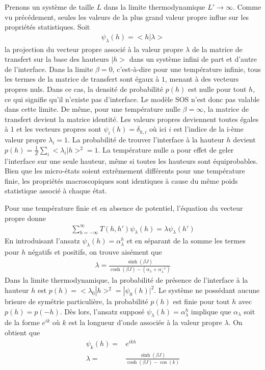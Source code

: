 Prenons un système de taille $L$ dans la limite thermodynamique $L'\to \infty$. Comme vu précédement, seules les valeurs de la plus grand valeur propre influe sur les propriétés statistiques. Soit 
\begin{align}
    \psi_\lambda(h)= <h|\lambda>
\end{align}
la projection du vecteur propre associé à la valeur propre $\lambda$ de la matrice de transfert sur la base des hauteurs $|h>$ dans un système infini de part et d'autre de l'interface.
Dans la limite $\beta=0$, c'est-à-dire pour une température infinie, tous les termes de la matrice de transfert sont égaux à $1$, menant à des vecteurs propres nuls. Dans ce cas, la densité de probabilité $p(h)$ est nulle pour tout $h$, ce qui signifie qu'il n'existe pas d'interface. Le modèle SOS n'est donc pas valable dans cette limite. De même, pour une température nulle $\beta=\infty$, la matrice de transfert devient la matrice identité. Les valeurs propres deviennent toutes égales à $1$ et les vecteurs propres sont $\psi_i(h) = \delta_{h,i}$ où ici $i$ est l'indice de la i-ème valeur propre $\lambda_i = 1$. La probabilité de trouver l'interface à la hauteur $h$ devient $p(h) = \frac{1}{Z}\sum_{i} <\lambda_i | h >^2 = 1$. La température nulle a pour effet de geler l'interface sur une seule hauteur, même si toutes les hauteurs sont équiprobables. Bien que les micro-états soient extrêmement différents pour une température finie, les propriétés macroscopiques sont identiques à cause du même poids statistique associé à chaque état.

Pour une température finie et en absence de potentiel\cite{guyer_sine-gordon_1979,chui_pinning_1981}, l'équation du vecteur propre donne
\begin{align}
	\sum_{h=-\infty}^\infty T(h,h') \psi_\lambda(h) = \lambda \psi_\lambda(h')
\end{align}
En introduisant l'ansatz $\psi_\lambda(h) = \alpha_{\lambda}^h$ et en séparant de la somme les termes pour $h$ négatifs et positifs, on trouve aisément que 
\begin{align}
	\lambda = \frac{\sinh(\beta J)}{\cosh(\beta J)-(\alpha_{\lambda}+\alpha_{\lambda}^{-1})} 
\end{align}
Dans la limite thermodynamique, la probabilité de présence de l'interface à la hauteur $h$ est $p(h) = <\lambda_0|h>^2 = |\psi_0(h)|^2$. Le système ne possédant aucune brisure de symétrie particulière, la probabilité $p(h)$ est finie pour tout $h$ avec $p(h)=p(-h)$. Dès lors, l'ansatz supposé $\psi_\lambda(h) = \alpha_{\lambda}^h$ implique que $\alpha_{\lambda}$ soit de la forme $e^{ik}$ où $k$ est la longueur d'onde associée à la valeur propre $\lambda$. On obtient que 
\begin{align}
	\psi_k(h) =& e^{ikh} \\
	\lambda =& \frac{\sinh(\beta J)}{\cosh(\beta J) - \cos(k)}
	\label{lambda-sos}
\end{align}

